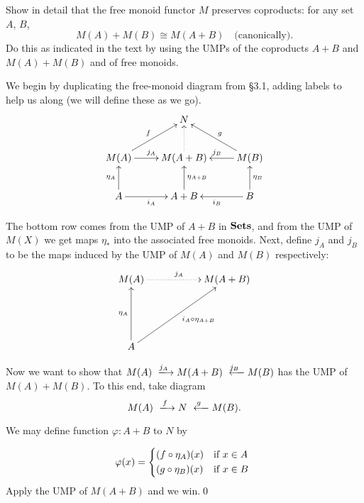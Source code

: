\clearpage
\begin{BookProblem}{2}
  Show in detail that the free monoid functor \(M\) preserves coproducts: for any
  set \(A\), \(B\),
  \[M(A) + M(B) \cong M(A + B)\quad\text{(canonically).}\]
  Do this as indicated in the text by using the UMPs of the coproducts \(A + B\)
  and \(M(A) + M(B)\) and of free monoids.\\

  \begin{Solution}
    We begin by duplicating the free-monoid diagram from \S3.1, adding labels to
    help us along (we will define these as we go).
    \begin{equation}
      \xymatrix{
      & N & \\
      M(A)\ar[r]^{j_A}\ar[ur]^f & M(A + B)\ar@{..>}[u] & M(B)\ar[l]_{j_B}\ar[lu]_g\\
      A\ar[r]_{i_A}\ar[u]^{\eta_A} & A + B\ar[u]_{\eta_{A+B}} & B\ar[l]^{i_B}\ar[u]_{\eta_B}
    }
    \end{equation}

    The bottom row comes from the UMP of \(A + B\) in \(\mathbf{{Sets}}\), and from the
    UMP of \(M(X)\) we get maps \(\eta_*\) into the associated free monoids.
    Next, define \(j_A\) and \(j_B\) to be the maps induced by the UMP of
    \(M(A)\) and \(M(B)\) respectively:
    \begin{equation}
      \xymatrix{
        M(A)\ar@{..>}[rr]^{j_A} && M(A + B)\\
        &&\\
        A\ar[uurr]_{\ \ {i_A}\circ \eta_{A + B}}\ar[uu]^{\eta_A} &&
      }
    \end{equation}

    Now we want to show that \(M(A) \xlongrightarrow{j_A} M(A + B)
    \xlongleftarrow{j_B} M(B)\) has the UMP of \(M(A) + M(B)\). To this end,
    take diagram
    \[ M(A) \xlongrightarrow{f} N \xlongleftarrow{g} M(B). \]

    We may define function \(\varphi : A + B\) to \(N\) by

    \[\varphi(x) = \begin{dcases*}
      (f \circ\eta_A)(x) & if \(x \in A\)\\
      (g \circ\eta_B)(x) & if \(x \in B\)
    \end{dcases*}
    \]
    Apply the UMP of \(M(A + B)\) and we win.\qed{}
  \end{Solution}
\end{BookProblem}

